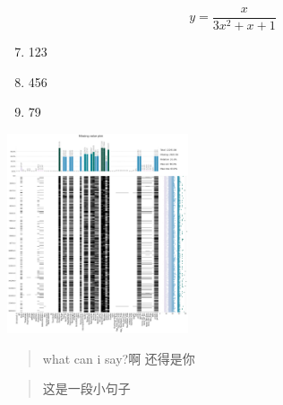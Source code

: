 \documentclass[10pt, a4paper]{article}
\begin{document}
\def\eq1{y=\dfrac{x}{3x^2+x+1}}

$$\eq1$$

\newcommand{\set}[1]{\setlength\itemsep{#1em}}
\begin{enumerate} \setcounter{enumi}{6}
    \set{0.5}
    \item 123
    \item 456
    \item 79
\end{enumerate}

\begin{center}
    \includegraphics[width=0.4\textwidth]{output}
\end{center}

\begin{quote}
    \kaishu what can i say?啊
    \songti 还得是你
\end{quote}

\begin{abstract}
    这是一段小句子
\end{abstract}
\end{document}
